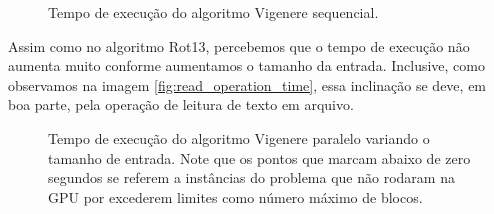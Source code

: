 \documentclass[12pt]{article}
\begin{document}
\begin{center}
\begin{figure}[H]
    \caption{Tempo de execução do algoritmo Vigenere sequencial.}
    \label{fig:vigenere_seqtime} 
\end{figure}
\end{center}

Assim como no algoritmo Rot13, percebemos que o tempo de execução não 
aumenta muito conforme aumentamos o tamanho da entrada. Inclusive, como
observamos na imagem \ref{fig:read_operation_time}, essa inclinação se 
deve, em boa parte, pela operação de leitura de texto em arquivo.

\begin{figure}[H]
    \caption{Tempo de execução do algoritmo Vigenere paralelo variando o
    tamanho de entrada. Note que os pontos que marcam abaixo de zero 
    segundos se referem a instâncias do problema que não rodaram na GPU
    por excederem limites como número máximo de blocos.}
\end{figure}
\end{document}
